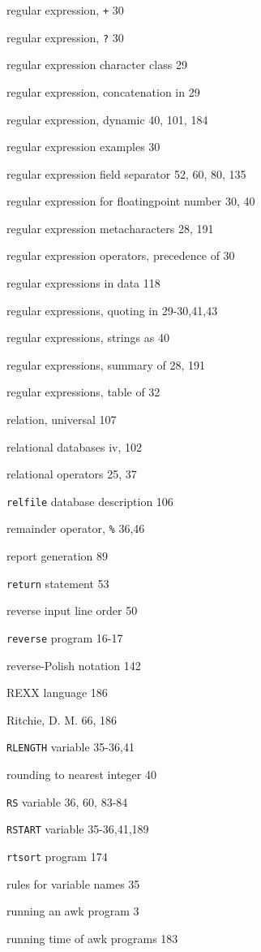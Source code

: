 \begin{multicols}{2}
regular expression, \verb'+' 30

regular expression, \verb'?' 30

regular expression character class 29

regular expression, concatenation in 29

regular expression, dynamic 40, 101, 184

regular expression examples 30

regular expression field separator 52, 60, 80, 135

regular expression for floatingpoint number 30, 40



regular expression metacharacters 28, 191

regular expression operators, precedence of 30

regular expressions in data 118

regular expressions, quoting in 29-30,41,43

regular expressions, strings as 40

regular expressions, summary of 28, 191

regular expressions, table of 32

relation, universal 107

relational databases iv, 102

relational operators 25, 37

\verb'relfile' database description 106

remainder operator, \verb'%' 36,46

report generation 89

\verb'return' statement 53

reverse input line order 50

\verb'reverse' program 16-17

reverse-Polish notation 142

REXX language 186

Ritchie, D. M. 66, 186

\verb'RLENGTH' variable 35-36,41

rounding to nearest integer 40

\verb'RS' variable 36, 60, 83-84

\verb'RSTART' variable 35-36,41,189

\verb'rtsort' program 174

rules for variable names 35

running an awk program 3

running time of awk programs 183


\end{multicols}
